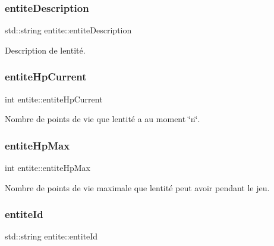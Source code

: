 \subsubsection{\texorpdfstring{entite\+Description}{entiteDescription}}
{\footnotesize\ttfamily std\+::string entite\+::entite\+Description\hspace{0.3cm}{\ttfamily [protected]}}



Description de l\textquotesingle{}entité. 

\mbox{\label{classentite_a09661bc80d898530a760153f6b690070}} 
\subsubsection{\texorpdfstring{entite\+Hp\+Current}{entiteHpCurrent}}
{\footnotesize\ttfamily int entite\+::entite\+Hp\+Current\hspace{0.3cm}{\ttfamily [protected]}}



Nombre de points de vie que l\textquotesingle{}entité a au moment \char`\"{}n\char`\"{}. 

\mbox{\label{classentite_a754557f56c1c1fcbcbd40eec68b60f65}} 
\subsubsection{\texorpdfstring{entite\+Hp\+Max}{entiteHpMax}}
{\footnotesize\ttfamily int entite\+::entite\+Hp\+Max\hspace{0.3cm}{\ttfamily [protected]}}



Nombre de points de vie maximale que l\textquotesingle{}entité peut avoir pendant le jeu. 

\mbox{\label{classentite_a904e8783de9fe2fc4306bf6b7822d025}} 
\subsubsection{\texorpdfstring{entite\+Id}{entiteId}}
{\footnotesize\ttfamily std\+::string entite\+::entite\+Id\hspace{0.3cm}{\ttfamily [protected]}}




